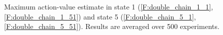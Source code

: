 \documentclass[conference]{IEEEtran}
\begin{document}
\begin{figure}[t]
\begin{minipage}{\textwidth}
\end{minipage}
\caption{Maximum action-value estimate in state 1 (\ref{F:double_chain_1_1}, \ref{F:double_chain_1_51}) and state 5 (\ref{F:double_chain_5_1}, \ref{F:double_chain_5_51}). Results are averaged over 500 experiments.}
  \label{F:double_chain_q}
\end{figure}
\end{document}
